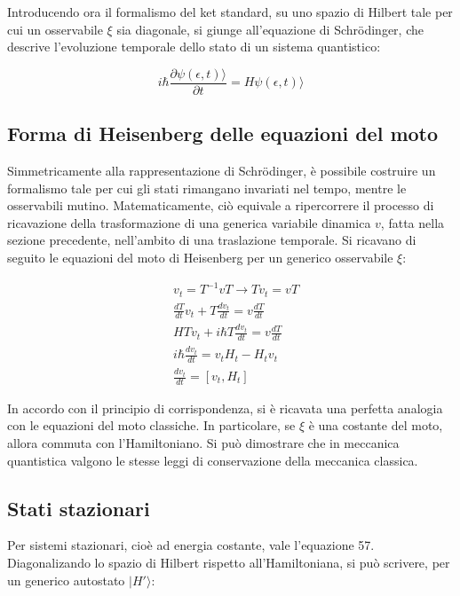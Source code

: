 \documentclass{article}
\begin{document}
Introducendo ora il formalismo del ket standard, su uno spazio di Hilbert tale per cui un osservabile $\xi$ sia diagonale,
si giunge all'equazione di Schrödinger, che descrive l'evoluzione temporale dello stato di un sistema quantistico:

\begin{equation}
  i\hbar \frac{\partial \psi(\epsilon,t)\rangle }{\partial t}= H\psi(\epsilon,t)\rangle
\end{equation}

\subsection{Forma di Heisenberg delle equazioni del moto}
Simmetricamente alla rappresentazione di Schrödinger, è possibile costruire un formalismo tale per cui gli stati rimangano invariati nel tempo,
mentre le osservabili mutino.
Matematicamente, ciò equivale a ripercorrere il processo di ricavazione della trasformazione di una generica variabile dinamica $v$, fatta nella sezione precedente,
nell'ambito di una traslazione temporale.
Si ricavano di seguito le equazioni del moto di Heisenberg per un generico osservabile $\xi$:

\begin{equation}
  \begin{aligned}
     & v_t=T^{-1}vT \rightarrow Tv_t= vT                 \\
     & \frac{dT}{dt}v_t+T\frac{dv_t}{dt}= v\frac{dT}{dt} \\
     & HTv_t+i\hbar T \frac{d v_t}{dt}=v\frac{dT}{dt}    \\
     & i\hbar \frac{dv_t}{dt}=v_tH_t-H_tv_t              \\
     & \frac{dv_t}{dt}=[v_t, H_t]
  \end{aligned}
\end{equation}

In accordo con il principio di corrispondenza, si è ricavata una perfetta analogia con le equazioni del moto classiche.
In particolare, se $\xi$ è una costante del moto, allora commuta con l'Hamiltoniano.
Si può dimostrare che in meccanica quantistica valgono le stesse leggi di conservazione della meccanica classica.

\subsection{Stati stazionari}
Per sistemi stazionari, cioè ad energia costante, vale l'equazione 57.
Diagonalizando lo spazio di Hilbert rispetto all'Hamiltoniana, si può scrivere, per un generico autostato $|H'\rangle $:
\end{document}
